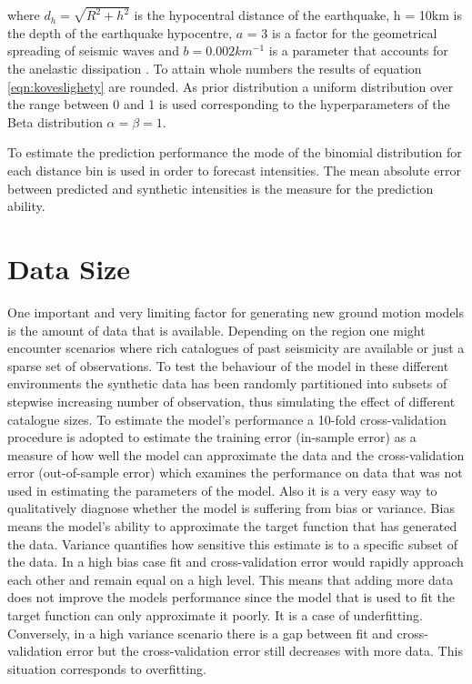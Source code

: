 where
$d_h = \sqrt{R^2+h^2}$ is the hypocentral distance of the earthquake, h = 10km is the depth of the earthquake hypocentre, $a$ = 3 is a factor for the geometrical spreading of seismic waves and $b = 0.002 km^{-1}$ is a parameter that accounts for the anelastic dissipation \citep{stromeyer2009attenuation}. To attain whole numbers the results of equation \ref{eqn:koveslighety} are rounded. As prior distribution a uniform distribution over the range between 0 and 1 is used corresponding to the hyperparameters of the Beta distribution $\alpha = \beta = 1$.



To estimate the prediction performance the mode of the binomial distribution for each distance bin is used in order to forecast intensities. The mean absolute error between predicted and synthetic intensities is the measure for the prediction ability.

\section{Data Size}

One important and very limiting factor for generating new ground motion models is the amount of data that is available. Depending on the region one might encounter scenarios where rich catalogues of past seismicity are available or just a sparse set of observations. To test the behaviour of the model in these different environments the synthetic data has been randomly partitioned into subsets of stepwise increasing number of observation, thus simulating the effect of different catalogue sizes. To estimate the model's performance a 10-fold cross-validation procedure is adopted to estimate the training error (in-sample error) as a measure of how well the model can approximate the data and the cross-validation error (out-of-sample error) which examines the performance on data that was not used in estimating the parameters of the model. Also it is a very easy way to qualitatively diagnose whether the model is suffering from bias or variance. Bias means the model's ability to approximate the target function that has generated the data. Variance quantifies how sensitive this estimate is to a specific subset of the data.  In a high bias case fit and cross-validation error would rapidly approach each other and remain equal on a high level. This means that adding more data does not improve the models performance since the model that is used to fit the target function can only approximate it poorly. It is a case of underfitting. Conversely, in a high variance scenario there is a gap between fit and cross-validation error but the cross-validation error still decreases with more data. This situation corresponds to overfitting.\\
 
